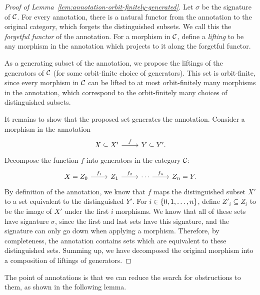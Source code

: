 \begin{proof}[Proof of Lemma~\ref{lem:annotation-orbit-finitely-generated}]

    Let $\sigma$ be the signature of ${\mathcal C}$. 
    For every annotation, there is a natural functor from the annotation to the original category, which forgets the  distinguished subsets. We call this the \emph{forgetful functor} of the annotation. For a morphism in ${\mathcal C}$, define a \emph{lifting} to be any morphism in the annotation which projects to it along the forgetful functor. 



As a generating subset of the annotation, we propose the liftings of the generators of ${\mathcal C}$  (for some orbit-finite choice of generators). This set is orbit-finite, since every morphism in ${\mathcal C}$ can be lifted to at most orbit-finitely many morphisms in the annotation,  which correspond to the orbit-finitely many choices of distinguished subsets. 

It remains to show that the proposed set generates the annotation. 
Consider a morphism in the annotation 
\[
\begin{tikzcd}
X \subseteq X'
\ar[r,"f"] & 
Y \subseteq Y'.
\end{tikzcd}
\]
Decompose the function $f$ into generators in the category ${\mathcal C}$:
    \[
\begin{tikzcd}
X = Z_0 \ar[r,"f_1"] & 
Z_1 \ar[r,"f_2"] &
\cdots 
\ar[r,"f_n"]
&  Z_n = Y.
\end{tikzcd}
\]
By definition of the annotation, we know that $f$ maps the distinguished subset $X'$ to a set equivalent to the distinguished  $Y'$. For $i \in \{0,1,\ldots,n\}$, define $Z'_i \subseteq Z_i$ to be the image of $X'$ under the first $i$ morphisms. We know that all of these sets have signature $\sigma$, since the first and last sets have this signature, and the signature can only go down when applying a morphism. Therefore, by completeness, the annotation contains sets which are equivalent to these distinguished sets. Summing up, we have decomposed the original morphism into a composition of liftings of generators. 
\end{proof}


The point of annotations is that we can reduce the search for obstructions to them, as shown in the following lemma. 

